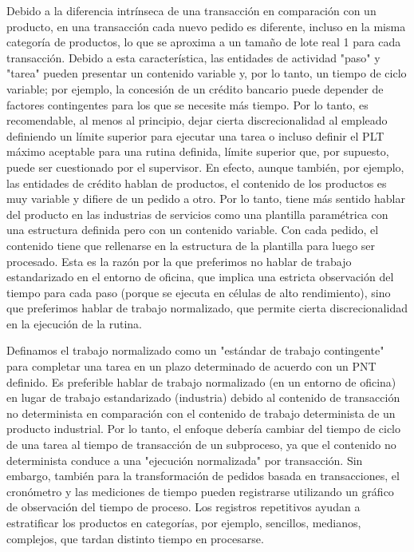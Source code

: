 Debido a la diferencia intrínseca de una transacción en comparación con un producto, en una transacción cada nuevo pedido es diferente, incluso en la misma categoría de productos, lo que se aproxima a un tamaño de lote real 1 para cada transacción.
Debido a esta característica, las entidades de actividad "paso" y "tarea" pueden presentar un contenido variable y, por lo tanto, un tiempo de ciclo variable; por ejemplo, la concesión de un crédito bancario puede depender de factores contingentes para los que se necesite más tiempo.
Por lo tanto, es recomendable, al menos al principio, dejar cierta discrecionalidad al empleado definiendo un límite superior para ejecutar una tarea o incluso definir el PLT máximo aceptable para una rutina definida, límite superior que, por supuesto, puede ser cuestionado por el supervisor.
En efecto, aunque también, por ejemplo, las entidades de crédito hablan de productos, el contenido de los productos es muy variable y difiere de un pedido a otro.
Por lo tanto, tiene más sentido hablar del producto en las industrias de servicios como una plantilla paramétrica con una estructura definida pero con un contenido variable.
Con cada pedido, el contenido tiene que rellenarse en la estructura de la plantilla para luego ser procesado.
Esta es la razón por la que preferimos no hablar de trabajo estandarizado en el entorno de oficina, que implica una estricta observación del tiempo para cada paso (porque se ejecuta en células de alto rendimiento), sino que preferimos hablar de trabajo normalizado, que permite cierta discrecionalidad en la ejecución de la rutina.

Definamos el trabajo normalizado como un "estándar de trabajo contingente" para completar una tarea en un plazo determinado de acuerdo con un PNT definido.
Es preferible hablar de trabajo normalizado (en un entorno de oficina) en lugar de trabajo estandarizado (industria) debido al contenido de transacción no determinista en comparación con el contenido de trabajo determinista de un producto industrial.
Por lo tanto, el enfoque debería cambiar del tiempo de ciclo de una tarea al tiempo de transacción de un subproceso, ya que el contenido no determinista conduce a una "ejecución normalizada" por transacción.
Sin embargo, también para la transformación de pedidos basada en transacciones, el cronómetro y las mediciones de tiempo pueden registrarse utilizando un gráfico de observación del tiempo de proceso. Los registros repetitivos ayudan a estratificar los productos en categorías, por ejemplo, sencillos, medianos, complejos, que tardan distinto tiempo en procesarse.

